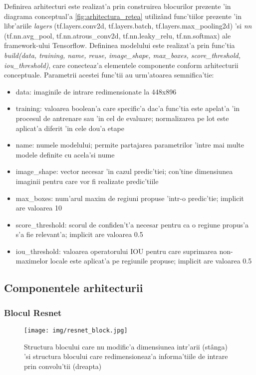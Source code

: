 \documentclass[12pt,a4paper,twoside]{report}
\begin{document}
Definirea arhitecturi este realizat'a prin construirea blocurilor prezente 'in diagrama conceptual'a \ref{fig:arhitectura_retea} utiliz\^and func'tiilor prezente 'in libr'ariile \textit{layers} (tf.layers.conv2d, tf.layers.batch,  tf.layers.max\_pooling2d) 'si \textit{nn} (tf.nn.avg\_pool, tf.nn.atrous\_conv2d, tf.nn.leaky\_relu, tf.nn.softmax) ale framework-ului Tensorflow. Defininea modelului este realizat'a prin func'tia \textit{build(data, training, name, reuse, image\_shape, max\_boxes, score\_threshold, iou\_threshold)}, care conecteaz'a elementele componente conform arhitecturii conceptuale. Parametrii acestei func'tii au urm'atoarea semnifica'tie:
\begin{itemize}
\item data: imaginile de intrare redimensionate la 448x896
\item training: valoarea boolean'a care specific'a dac'a func'tia este apelat'a 'in procesul de antrenare sau 'in cel de evaluare; normalizarea pe lot este aplicat'a diferit 'in cele dou'a etape
\item name: numele modelului; permite partajarea parametrilor 'intre mai multe modele definite cu acela'si nume
\item image\_shape: vector necesar 'in cazul predic'tiei; con'tine dimensiunea imaginii pentru care vor fi realizate predic'tiile
\item max\_boxes: num'arul maxim de regiuni propuse 'intr-o predic'tie; implicit are valoarea 10
\item score\_threshold: scorul de confiden't'a necesar pentru ca o regiune propus'a s'a fie relevant'a; implicit are valoarea 0.5
\item iou\_threshold: valoarea operatorului IOU pentru care suprimarea non-maximelor locale este aplicat'a pe regiunile propuse; implicit are valoarea 0.5
\end{itemize}

\subsection{Componentele arhitecturii}
\subsubsection{Blocul Resnet}
\begin{figure}[H]
  \texttt{[image: img/resnet\_block.jpg]}
  \centering
  \caption{Structura blocului care nu modific'a dimensiunea intr'arii (st\^anga) 'si structura blocului care redimensioneaz'a informa'tiile de intrare prin convolu'tii (dreapta)\protect \footnotemark}
  \label{fig:resnet_block}
\end{figure}
\end{document}
